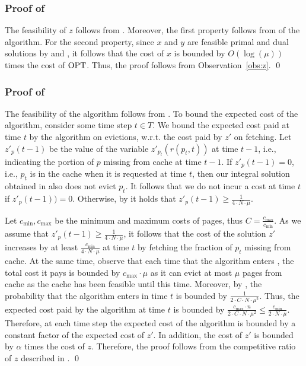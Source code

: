 \documentclass[11pt]{article}
\newcommand{\OPT}{\textnormal{OPT}}
\begin{document}
\subsubsection*{Proof of }
The feasibility of $z$ follows from . Moreover, the first property follows from  of the algorithm. For the second property, since $x$ and $y$ are feasible primal and dual solutions by  and , it follows that the cost of $x$ is bounded by $O(\log (\mu))$ times the cost of $\OPT$. Thus, the proof follows from Observation~\ref{obs:z}. \qed

\subsubsection*{Proof of }
The feasibility of the algorithm follows from . To bound the expected cost of the algorithm, consider some time step $t \in T$. We bound the expected cost paid at time $t$ by the algorithm on evictions, w.r.t. the cost paid by $z'$ on fetching. Let $z'_p(t-1)$ be the value of the variable $z'_{p_t}(r(p_t,t))$ at time $t-1$, i.e., indicating the portion of $p$ missing from cache at time $t-1$. If $z'_p(t-1) = 0$, i.e., $p_t$ is in the cache when it is requested at time $t$, then our integral solution obtained in  also does not evict $p_t$. It follows that we do not incur a cost at time $t$ if $z'_p(t-1)) = 0$. Otherwise, by  it holds that $z'_p(t-1) \geq \frac{1}{4 \cdot N \cdot \mu}$. 
	
	Let $c_{\min}, c_{\max}$ be the minimum and maximum costs of pages, thus $C = \frac{c_{\max}}{c_{\min}}$.  As we assume that $z'_p(t-1) \geq \frac{1}{4 \cdot N \cdot \mu}$, it follows that the cost of the solution $z'$ increases by at least $\frac{c_{\min}}{4 \cdot N \cdot \mu}$ at time $t$ by fetching the fraction of $p_t$ missing from cache. At the same time, observe that each time that the algorithm enters , the total cost it pays is bounded by $c_{\max} \cdot \mu$ as it can evict at most $\mu$ pages from cache as the cache has been feasible until this time.  Moreover, by , the probability that the algorithm enters  in time $t$ is bounded by $\frac{1}{2 \cdot C \cdot N \cdot \mu^2}$. Thus, the expected cost paid by the algorithm at time $t$ is bounded by $\frac{c_{\max} \cdot n}{2 \cdot C \cdot N \cdot \mu^2} \leq \frac{c_{\min}}{2 \cdot N \cdot \mu}$. Therefore, at each time step the expected cost of the algorithm is bounded by a constant factor of the expected cost of $z'$. In addition, the cost of $z'$ is bounded by $\alpha$ times the cost of $z$. Therefore, the proof follows from the competitive ratio of $z$ described in . \qed
	
\end{document}
